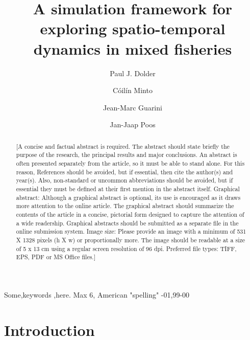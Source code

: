 \documentclass[review]{elsarticle}
\begin{document}
\begin{frontmatter}

\title{A simulation framework for exploring spatio-temporal dynamics in mixed
	fisheries}

\author[1,2]{Paul J. Dolder}

\author[1]{Cóilín Minto}
\author[3]{Jean-Marc Guarini}
\author[4]{Jan-Jaap Poos}

\address[1]{Galway-Mayo Institute of Technology (GMIT), Dublin Road, Galway,
	Ireland} 
\address[2]{Centre for Environment, Fisheries and Aquaculture Science (Cefas),
	Pakefield Road, Lowestoft, UK}
\address[3]{UPMC}
\address[4]{Wageningen Marine}

\begin{abstract}
[A concise and factual abstract is required. The abstract should state briefly
the purpose of the research, the principal results and major conclusions. An
abstract is often presented separately from the article, so it must be able to
stand alone. For this reason, References should be avoided, but if essential,
then cite the author(s) and year(s). Also, non-standard or uncommon
abbreviations should be avoided, but if essential they must be defined at their
first mention in the abstract itself.  
Graphical abstract: Although a graphical abstract is optional, its use is
encouraged as it draws more attention to the online article. The graphical
abstract should summarize the contents of the article in a concise, pictorial
form designed to capture the attention of a wide readership. Graphical
abstracts should be submitted as a separate file in the online submission
system. Image size: Please provide an image with a minimum of 531 X 1328 pixels
(h X w) or proportionally more. The image should be readable at a size of 5 x
13 cm using a regular screen resolution of 96 dpi.  Preferred file types: TIFF,
EPS, PDF or MS Office files.]
\end{abstract}

\begin{keyword}
Some\sep keywords \sep here. Max 6, American "spelling" 
-01\sep  99-00
\end{keyword}

\end{frontmatter}

\linenumbers

\section{Introduction}
\end{document}

